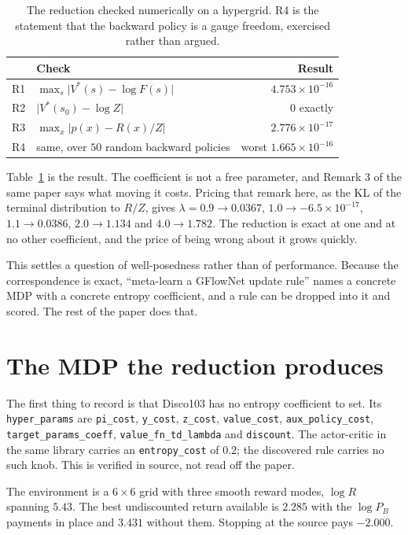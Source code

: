 \documentclass[11pt]{article}
\theoremstyle{remark}
\newcommand{\us}{\_\allowbreak}
\begin{document}
\begin{table}[t]
\centering
\begin{tabular}{llr}
\toprule
 & Check & Result \\
\midrule
R1 & $\max_s \lvert V^*(s) - \log F(s)\rvert$ & $4.753\times 10^{-16}$ \\
R2 & $\lvert V^*(s_0) - \log Z\rvert$ & $0$ exactly \\
R3 & $\max_x \lvert p(x) - R(x)/Z\rvert$ & $2.776\times 10^{-17}$ \\
R4 & same, over $50$ random backward policies & worst $1.665\times 10^{-16}$ \\
\bottomrule
\end{tabular}
\caption{The reduction checked numerically on a hypergrid. R4 is the statement
that the backward policy is a gauge freedom, exercised rather than argued.}
\label{tab:reduction}
\end{table}

Table~\ref{tab:reduction} is the result. The coefficient is not a free parameter,
and Remark 3 of the same paper says what moving it costs. Pricing that remark
here, as the KL of the terminal distribution to $R/Z$, gives $\lambda = 0.9
\to 0.0367$, $1.0 \to -6.5\times 10^{-17}$, $1.1 \to 0.0386$, $2.0 \to 1.134$
and $4.0 \to 1.782$. The reduction is exact at one and at no other coefficient,
and the price of being wrong about it grows quickly.

This settles a question of well-posedness rather than of performance. Because the
correspondence is exact, ``meta-learn a GFlowNet update rule'' names a concrete
MDP with a concrete entropy coefficient, and a rule can be dropped into it and
scored. The rest of the paper does that.

\section{The MDP the reduction produces}\label{sec:mdp}

The first thing to record is that Disco103 has no entropy coefficient to set. Its
\texttt{hyper\us params} are \texttt{pi\us cost}, \texttt{y\us cost},
\texttt{z\us cost}, \texttt{value\us cost}, \texttt{aux\us policy\us cost},
\texttt{target\us params\us coeff}, \texttt{value\us fn\us td\us lambda} and
\texttt{discount}. The actor-critic in the same library carries an
\texttt{entropy\us cost} of $0.2$; the discovered rule carries no such knob. This
is verified in source, not read off the paper.

The environment is a $6\times 6$ grid with three smooth reward modes, $\log R$
spanning $5.43$. The best undiscounted return available is $2.285$ with the
$\log P_B$ payments in place and $3.431$ without them. Stopping at the source pays
$-2.000$.
\end{document}
